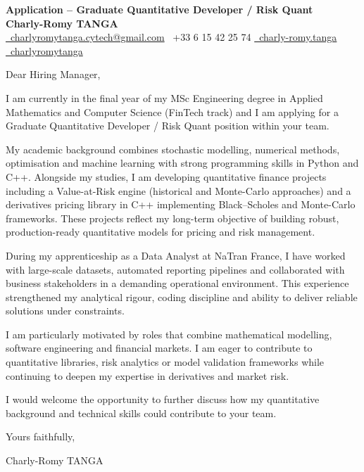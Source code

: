 \documentclass[10pt, letterpaper]{article}
\begin{document}
\begin{center}
    \textbf{\LARGE Application – Graduate Quantitative Developer / Risk Quant} \\[0.3cm]
    \textbf{Charly-Romy TANGA} \\[0.2cm]
    
    \href{mailto:charlyromytanga.cytech@gmail.com}{\faEnvelope\ charlyromytanga.cytech@gmail.com}
    \quad
    \faPhone\ +33 6 15 42 25 74
    \quad
    \href{https://www.linkedin.com/in/charly-romy-tanga}{\faLinkedin\ charly-romy.tanga}
    \quad
    \href{https://github.com/charlyromytanga}{\faGithub\ charlyromytanga}
\end{center}

\vspace{1cm}

Dear Hiring Manager,

I am currently in the final year of my MSc Engineering degree in Applied Mathematics and Computer Science (FinTech track) and I am applying for a Graduate Quantitative Developer / Risk Quant position within your team.

My academic background combines stochastic modelling, numerical methods, optimisation and machine learning with strong programming skills in Python and C++. Alongside my studies, I am developing quantitative finance projects including a Value-at-Risk engine (historical and Monte-Carlo approaches) and a derivatives pricing library in C++ implementing Black–Scholes and Monte-Carlo frameworks. These projects reflect my long-term objective of building robust, production-ready quantitative models for pricing and risk management.

During my apprenticeship as a Data Analyst at NaTran France, I have worked with large-scale datasets, automated reporting pipelines and collaborated with business stakeholders in a demanding operational environment. This experience strengthened my analytical rigour, coding discipline and ability to deliver reliable solutions under constraints.

I am particularly motivated by roles that combine mathematical modelling, software engineering and financial markets. I am eager to contribute to quantitative libraries, risk analytics or model validation frameworks while continuing to deepen my expertise in derivatives and market risk.

I would welcome the opportunity to further discuss how my quantitative background and technical skills could contribute to your team.

Yours faithfully,

\vspace{0.5cm}
Charly-Romy TANGA
\end{document}

